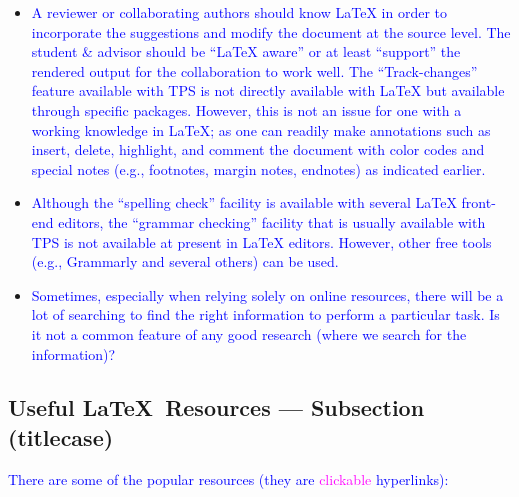 \documentclass[phd,showgrids]{ndsu-thesis-2022}
\newcommand\italk[1]{\textcolor{blue}{#1}}  %
\newcommand\lx{\LaTeX\xspace}
\begin{document}
\begin{itemize}[leftmargin=*, itemsep=0pt, parsep=3pt]
\item \italk{A reviewer or collaborating authors should know \lx in order to incorporate the suggestions and modify the document at the source level. The student \& advisor should be ``\lx aware'' or at least ``support'' the rendered output for the collaboration to work well.  The ``Track-changes'' feature available with TPS is not directly available with \lx but available through specific packages. However, this is not an issue for one with a working knowledge in \lx; as one can readily make annotations such as insert, delete, highlight, and comment the document with color codes and special notes (e.g., footnotes, margin notes, endnotes) as indicated earlier.} 

\item \italk{Although the ``spelling check'' facility is available with several \lx front-end editors, the ``grammar checking'' facility that is usually available with TPS is not available at present in \lx editors. However, other free tools (e.g., Grammarly and several others) can be used.}  

\item \italk{Sometimes, especially when relying solely on online resources, there will be a lot of searching to find the right information to perform a particular task. Is it not a common feature of any good research (where we search for the information)?} 

\end{itemize}

\subsection{Useful \LaTeX\ Resources --- Subsection (titlecase)} 

\italk{There are some of the popular resources (they are \textcolor{magenta}{clickable} hyperlinks):}
\end{document}
